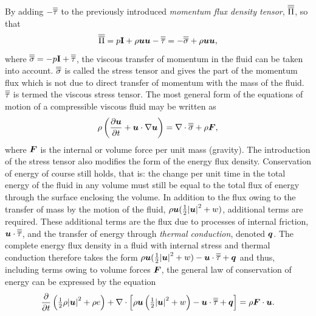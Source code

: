 By adding $-\overline{\overline{\tau}}$ to the previously introduced \textit{momentum flux density tensor}, $\overline{\overline{\Pi}}$, so that
\begin{equation}
 \overline{\overline{\Pi}}=p\mathbf{I}+\rho{\mbox{\boldmath$u$}}{\mbox{\boldmath$u$}}-\overline{\overline{\tau}}=-\overline{\overline{\sigma}}+\rho{\mbox{\boldmath$u$}}{\mbox{\boldmath$u$}},
\end{equation}
where $\overline{\overline{\sigma}}=-p\mathbf{I}+\overline{\overline{\tau}}$, the viscous transfer of momentum in the fluid can be taken into account. $\overline{\overline{\sigma}}$ is called the stress tensor and gives the part of the momentum flux which is not due to direct transfer of momentum with the mass of the fluid. $\overline{\overline{\tau}}$ is termed the viscous stress tensor. The most general form of the equations of motion of a compressible viscous fluid may be written as
\begin{equation}\label{viscous_fluids_1}
 \rho\left(\frac{\partial{\mbox{\boldmath$u$}}}{\partial{t}}+{\mbox{\boldmath$u$}}\cdot\nabla{\mbox{\boldmath$u$}}\right)=\nabla\cdot\overline{\overline{\sigma}}+\rho{\mbox{\boldmath$F$}},
\end{equation}
where ${\mbox{\boldmath$F$}}$ is the internal or volume force per unit mass (\eg gravity). The introduction of the stress tensor also modifies the form of the energy flux density. Conservation of energy of course still holds, that is: the change per unit time in the total energy of the fluid in any volume must still be equal to the total flux of energy through the surface enclosing the volume. In addition to the flux owing to the transfer of mass by the motion of the fluid, $\rho{\mbox{\boldmath$u$}}({\textstyle \frac{1}{2}}{|{\mbox{\boldmath$u$}}|}^{2}+w)$, additional terms are required. These additional terms are the flux due to processes of internal friction, ${\mbox{\boldmath$u$}}\cdot\overline{\overline{\tau}}$, and the transfer of energy through \textit{thermal conduction}, denoted ${\mbox{\boldmath$q$}}$.
The complete energy flux density in a fluid with internal stress and thermal conduction therefore takes the form $\rho{\mbox{\boldmath$u$}}({\textstyle \frac{1}{2}}{|{\mbox{\boldmath$u$}}|}^{2}+w)-{\mbox{\boldmath$u$}}\cdot\overline{\overline{\tau}}+{\mbox{\boldmath$q$}}$ and thus, including terms owing to volume forces ${\mbox{\boldmath$F$}}$, the general law of conservation of energy can be expressed by the equation
\begin{equation}\label{viscous_fluids_2}
 \frac{\partial}{\partial{t}}\left({\textstyle \frac{1}{2}}\rho{|{\mbox{\boldmath$u$}}|}^{2}+\rho e\right)
 +\nabla\cdot\left[\rho{\mbox{\boldmath$u$}}\left({\textstyle \frac{1}{2}}{|{\mbox{\boldmath$u$}}|}^{2}+w\right)-{\mbox{\boldmath$u$}}\cdot\overline{\overline{\tau}}+{\mbox{\boldmath$q$}}\right]=\rho{\mbox{\boldmath$F$}}\cdot{\mbox{\boldmath$u$}}.
\end{equation}


